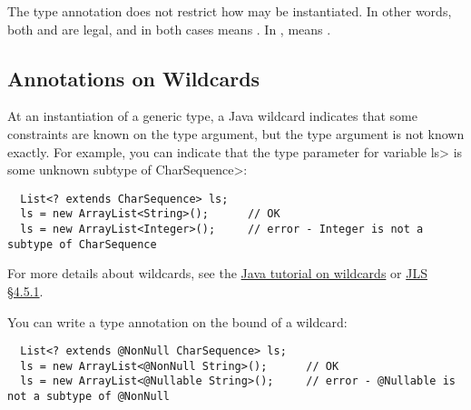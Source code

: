 \noindent
The type annotation does not restrict how  may be
instantiated.  In other words, both
 and  are
legal, and in both cases  means .
In ,
 means .





\subsection{Annotations on Wildcards\label{annotations-on-wildcards}}
At an instantiation of a generic type, a Java wildcard indicates that some
constraints are known on the type argument, but the type argument is not known
exactly.  
For example, you can indicate that the type parameter for variable \<ls> is
some unknown subtype of \<CharSequence>:

\begin{Verbatim}
  List<? extends CharSequence> ls;
  ls = new ArrayList<String>();      // OK
  ls = new ArrayList<Integer>();     // error - Integer is not a subtype of CharSequence
\end{Verbatim}

For more details about wildcards, see the
\href{https://docs.oracle.com/javase/tutorial/java/generics/wildcards.html}{Java
  tutorial on wildcards} or
\href{https://docs.oracle.com/javase/specs/jls/se8/html/jls-4.html#jls-4.5.1}{JLS
  \S 4.5.1}.

You can write a type annotation on the bound of a wildcard:

\begin{Verbatim}
  List<? extends @NonNull CharSequence> ls;
  ls = new ArrayList<@NonNull String>();      // OK
  ls = new ArrayList<@Nullable String>();     // error - @Nullable is not a subtype of @NonNull
\end{Verbatim}

